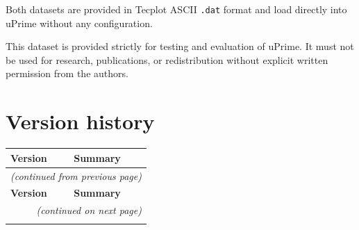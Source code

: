 \documentclass[11pt, a4paper]{report}
\newcommand{\software}[1]{\textsf{#1}}
\begin{document}
Both datasets are provided in Tecplot ASCII \texttt{.dat} format and load directly into \software{uPrime} without any configuration.

\begin{warnbox}
This dataset is provided strictly for testing and evaluation of \software{uPrime}. It must not be used for research, publications, or redistribution without explicit written permission from the authors.
\end{warnbox}

\chapter{Version history}

\begin{longtable}{lp{12cm}}
\toprule
\textbf{Version} & \textbf{Summary} \\
\midrule
\endfirsthead

\multicolumn{2}{l}{\small\textit{(continued from previous page)}} \\
\toprule
\textbf{Version} & \textbf{Summary} \\
\midrule
\endhead

\midrule
\multicolumn{2}{r}{\small\textit{(continued on next page)}} \\
\endfoot


\end{longtable}
\end{document}
